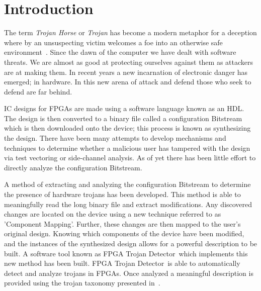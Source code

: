 \documentclass[conference]{IEEEtran}
\newcommand{\Name}{\acrshort{FPGA} Trojan Detector}
\newcommand{\NameNoPeriod}{\Name~}
\begin{document}




%
\IEEEpeerreviewmaketitle



\section{Introduction}
The term \textit{Trojan Horse} or \textit{Trojan} has become a modern metaphor for a deception where by an unsuspecting victim welcomes a foe into an otherwise safe environment~\cite{searchForTrojanWar}.
Since the dawn of the computer we have dealt with software threats.
We are almost as good at protecting ourselves against them as attackers are at making them.
In recent years a new incarnation of electronic danger has emerged; in hardware.
In this new arena of attack and defend those who seek to defend are far behind.

\acrshort{IC} designs for \acrfull{FPGAs} are made using a software language known as an \acrfull{HDL}.
The design is then converted to a binary file called a configuration \gls{Bitstream} which is then downloaded onto the device; this process is known as synthesizing the design.
There have been many attempts to develop mechanisms and techniques to determine whether a malicious user has tampered with the design via test vectoring or side-channel analysis.
As of yet there has been little effort to directly analyze the configuration \gls{Bitstream}.

A method of extracting and analyzing the configuration \gls{Bitstream} to determine the presence of hardware trojans has been developed.
This method is able to meaningfully read the long binary file and extract modifications.
Any discovered changes are located on the device using a new technique referred to as 'Component Mapping'.
Further, these changes are then mapped to the user's original design.
Knowing which components of the device have been modified, and the instances of the synthesized design allows for a powerful description to be built.
A software tool known as \NameNoPeriod which implements this new method has been built. 
\NameNoPeriod is able to automatically detect and analyze trojans in \acrshort{FPGAs}.
Once analyzed a meaningful description is provided using the trojan taxonomy presented in~\cite{samerAttribute}.
\end{document}
